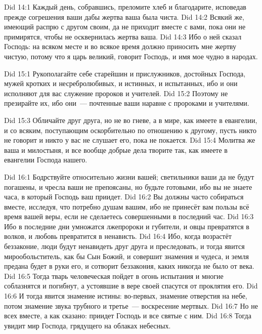 \vs Did 14:1
Каждый день,
собравшись, преломите хлеб и благодарите,
исповедав прежде согрешения ваши дабы жертва ваша была чиста.
\vs Did 14:2
Всякий же, имеющий распрю с другом своим, да не приходит вместе
с вами, пока они не примирятся, чтобы не осквернилась жертва ваша.
\vs Did 14:3
Ибо о ней сказал Господь: на всяком месте и во всякое время
должно приносить мне жертву чистую, потому что я царь великий,
говорит Господь, и имя мое чудно в народах.

\vs Did 15:1
Рукополагайте себе старейшин и прислужников, достойных Господа,
мужей кротких и несребролюбивых, и истинных, и испытанных,
ибо и они исполняют для вас служение пророков и учителей.
\vs Did 15:2
Поэтому не презирайте их, ибо они~--- почтенные ваши
наравне с пророками и учителями.

\vs Did 15:3
Обличайте друг друга, но не во гневе, а в мире, как имеете в
евангелии, и со всяким, поступающим оскорбительно по отношению к другому,
пусть никто не говорит и никто у вас не слушает его, пока не покается.
\vs Did 15:4
Молитва же ваша и милостыня, и все вообще добрые дела творите
так, как имеете в евангелии Господа нашего.

\vs Did 16:1
Бодрствуйте относительно жизни вашей;
светильники ваши да не будут погашены,
и чресла ваши не препоясаны,
но будьте готовыми, ибо вы не знаете часа,
в который Господь ваш приидет.
\vs Did 16:2
Вы должны часто собираться вместе, исследуя, что потребно душам
вашим, ибо не принесёт вам пользы всё время вашей веры,
если не сделаетесь совершенными в последний час.
\vs Did 16:3
Ибо в последние дни умножатся лжепророки и губители, и овцы
превратятся в волков, и любовь превратится в ненависть.
\vs Did 16:4
Ибо, когда возрастёт беззаконие, люди будут ненавидеть друг
друга и преследовать, и тогда явится мирообольститель,
как бы Сын Божий, и совершит знамения и чудеса, и земля
предана будет в руки его, и сотворит беззакония,
каких никогда не было от века.
\vs Did 16:5
Тогда тварь человеческая пойдет в огонь испытания и многие
соблазнятся и погибнут, а устоявшие в вере своей спасутся
от проклятия его.
\vs Did 16:6
И тогда явится знамение истины:
во-первых, знамение отверстия на небе,
потом знамение звука трубного
и третье~--- воскресение мертвых.
\vs Did 16:7
Но не всех вместе, а как сказано: приидет Господь и все святые с ним.
\vs Did 16:8
Тогда увидит мир Господа, грядущего на облаках небесных.
